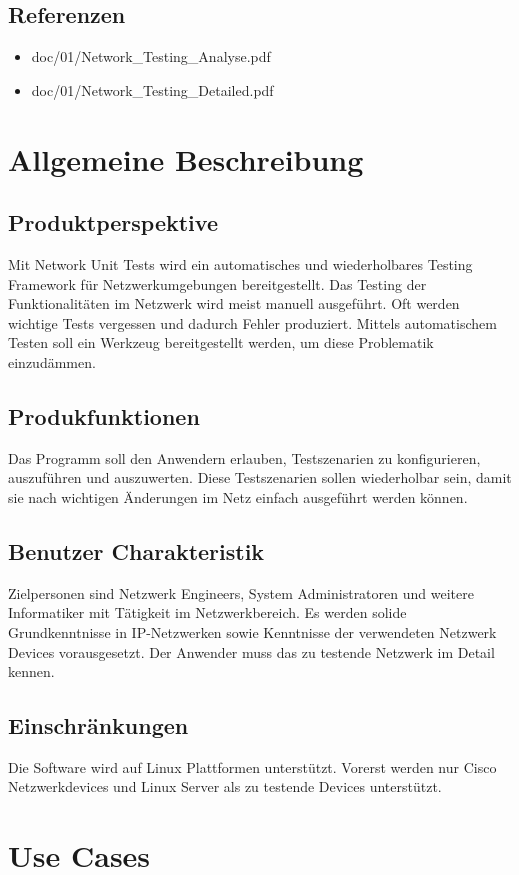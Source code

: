 \documentclass[a4,12pt]{scrartcl}
\begin{document}
\subsection{Referenzen}
\begin{itemize}
\item doc/01/Network\_Testing\_Analyse.pdf
\item doc/01/Network\_Testing\_Detailed.pdf

\end{itemize}

\newpage
\section{Allgemeine Beschreibung}
\subsection{Produktperspektive}
Mit Network Unit Tests wird ein automatisches und wiederholbares Testing Framework für Netzwerkumgebungen bereitgestellt. Das Testing der Funktionalitäten im Netzwerk wird meist manuell ausgeführt. Oft werden wichtige Tests vergessen und dadurch Fehler produziert. Mittels automatischem Testen soll ein Werkzeug bereitgestellt werden, um diese Problematik einzudämmen.
\subsection{Produkfunktionen}
Das Programm soll den Anwendern erlauben, Testszenarien zu konfigurieren, auszuführen und auszuwerten. Diese Testszenarien sollen wiederholbar sein, damit sie nach wichtigen Änderungen im Netz einfach ausgeführt werden können.
\subsection{Benutzer Charakteristik}
Zielpersonen sind Netzwerk Engineers, System Administratoren und weitere Informatiker mit Tätigkeit im Netzwerkbereich. Es werden solide Grundkenntnisse in IP-Netzwerken sowie Kenntnisse der verwendeten Netzwerk Devices vorausgesetzt. Der Anwender muss das zu testende Netzwerk im Detail kennen. 
\subsection{Einschränkungen}
Die Software wird auf Linux Plattformen unterstützt. Vorerst werden nur Cisco Netzwerkdevices und Linux Server als zu testende Devices unterstützt.
\newpage
\section{Use Cases}
\end{document}
